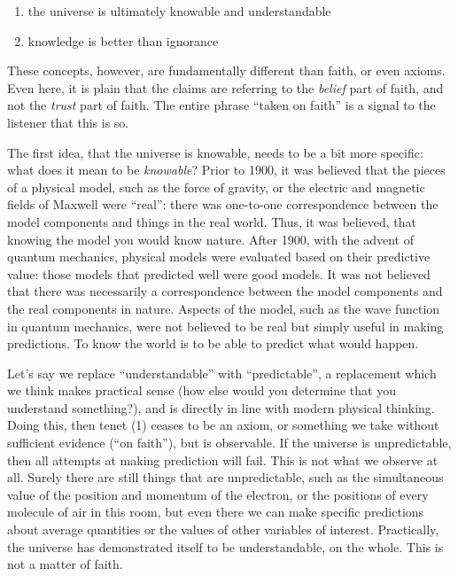 \documentclass{tufte-book}
\begin{document}
\begin{enumerate}
\item
  the universe is ultimately knowable and understandable
\item
  knowledge is better than ignorance
\end{enumerate}

These concepts, however, are fundamentally different than faith, or even
axioms. Even here, it is plain that the claims are referring to the
\emph{belief} part of faith, and not the \emph{trust} part of faith. The
entire phrase ``taken on faith'' is a signal to the listener that this
is so.

The first idea, that the universe is knowable, needs to be a bit more
specific: what does it mean to be \emph{knowable}? Prior to 1900, it was
believed that the pieces of a physical model, such as the force of
gravity, or the electric and magnetic fields of Maxwell were ``real'':
there was one-to-one correspondence between the model components and
things in the real world. Thus, it was believed, that knowing the model
you would know nature. After 1900, with the advent of quantum mechanics,
physical models were evaluated based on their predictive value: those
models that predicted well were good models. It was not believed that
there was necessarily a correspondence between the model components and
the real components in nature. Aspects of the model, such as the wave
function in quantum mechanics, were not believed to be real but simply
useful in making predictions. To know the world is to be able to predict
what would happen.

Let's say we replace ``understandable'' with ``predictable'', a
replacement which we think makes practical sense (how else would you
determine that you understand something?), and is directly in line with
modern physical thinking. Doing this, then tenet (1) ceases to be an
axiom, or something we take without sufficient evidence (``on faith''),
but is observable. If the universe is unpredictable, then all attempts
at making prediction will fail. This is not what we observe at all.
Surely there are still things that are unpredictable, such as the
simultaneous value of the position and momentum of the electron, or the
positions of every molecule of air in this room, but even there we can
make specific predictions about average quantities or the values of
other variables of interest. Practically, the universe has demonstrated
itself to be understandable, on the whole. This is not a matter of
faith.
\end{document}
